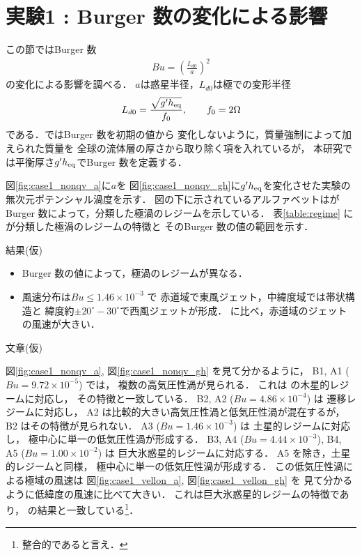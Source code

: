 \documentclass[a4j,12pt,openbib,oneside]{jreport}
\begin{document}
%
\clearpage
\newpage
\section{実験1 : Burger 数の変化による影響}
\label{sec:case1}
この節ではBurger 数 
\begin{align}
Bu = \left (\frac{L_{d0}}{a} \right )^2 \label{burger}
\end{align}
の変化による影響を調べる．
$a$は惑星半径，$L_{d0}$は極での変形半径
\begin{align}
L_{d0} = \frac{\sqrt{g'h_{{\rm{eq}}}}}{f_0}, \qquad f_0 = 2 \Omega
\end{align}
である．\cite{Brueshaber2019}ではBurger 数を初期の値から
変化しないように，質量強制によって加えられた質量を
全球の流体層の厚さから取り除く項を入れているが，
本研究では平衡厚さ$g'h_{{\rm{eq}}}$でBurger 数を定義する．

%
図\ref{fig:case1_nonqv_a}に$a$を
図\ref{fig:case1_nonqv_gh}に$g'h_{\rm{eq}}$を変化させた実験の
無次元ポテンシャル渦度を示す．
%
図の下に示されているアルファベットは\cite{Brueshaber2019}が
Burger 数によって，分類した極渦のレジームを示している．
表\ref{table:regime} に\cite{Brueshaber2019}が分類した極渦のレジームの特徴と
そのBurger 数の値の範囲を示す．
%

結果(仮)
\begin{itemize}
\item{Burger 数の値によって，極渦のレジームが異なる．}
\item{風速分布は$Bu \leq 1.46 \times 10^{-3} $ で
赤道域で東風ジェット，中緯度域では帯状構造と
緯度約$\pm 20^\circ - 30^\circ$で西風ジェットが形成．
\cite{Showman2007} に比べ，赤道域のジェットの風速が大きい．}
\end{itemize}
%

文章(仮) 

図\ref{fig:case1_nonqv_a}, 図\ref{fig:case1_nonqv_gh} を見て分かるように，
B1, A1 ($Bu = 9.72\times 10^{-5}$) では，
複数の高気圧性渦が見られる．
これは\cite{Brueshaber2019} の木星的レジームに対応し，
その特徴と一致している．
%
B2, A2 ($Bu = 4.86\times 10^{-4}$) は
遷移レジームに対応し，
A2 は比較的大きい高気圧性渦と低気圧性渦が混在するが，B2 はその特徴が見られない．
%
A3 ($Bu = 1.46\times 10^{-3}$) は
土星的レジームに対応し，
極中心に単一の低気圧性渦が形成する．
%
B3, A4 ($Bu = 4.44 \times 10^{-3}$), 
B4, A5 ($Bu = 1.00 \times 10^{-2}$) は
巨大氷惑星的レジームに対応する．
A5 を除き，土星的レジームと同様， 
極中心に単一の低気圧性渦が形成する．
この低気圧性渦による極域の風速は
図\ref{fig:case1_vellon_a}, 図\ref{fig:case1_vellon_gh} を
見て分かるように低緯度の風速に比べて大きい．
これは巨大氷惑星的レジームの特徴であり，
\cite{Brueshaber2019} の結果と一致している\footnote{整合的であると言え．}．
%
\end{document}
